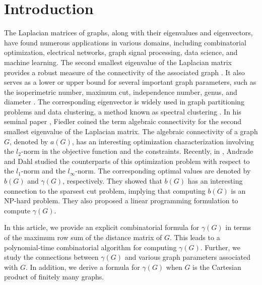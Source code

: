 \documentclass[12pt]{article}
\begin{document}
	\section{Introduction}
	The Laplacian matrices of graphs, along with their eigenvalues and eigenvectors, have found numerous applications in various domains, including combinatorial optimization, electrical networks, graph signal processing, data science, and machine learning. The second smallest eigenvalue of the Laplacian matrix provides a robust measure of the connectivity of the associated graph \cite{alg-con}.  It also serves as a lower or upper bound for several important graph parameters, such as the isoperimetric number, maximum cut, independence number, genus, and diameter \cite{mohar-lap-sur-1, mohar-eigen-comb-opti, trevisan_spec-partition}. The corresponding eigenvector is widely used in graph partitioning problems and data clustering, a method known as spectral clustering \cite{trevisan_spec-partition, ulrike-spectral}. In his seminal paper \cite{alg-con}, Fiedler coined the term algebraic connectivity for the second smallest eigenvalue of the Laplacian matrix. The algebraic connectivity of a graph $G$, denoted by $a(G)$,  has an interesting optimization characterization involving the $l_2$-norm in the objective function and the constraints. Recently, in \cite{enide-geir-2024}, Andrade and Dahl studied the counterparts of this optimization problem with respect to the $l_1$-norm and the $l_\infty$-norm. The corresponding optimal values are denoted by $b(G)$ and $\gamma (G)$, respectively. They showed that $b(G)$ has an interesting connection to the sparsest cut problem, implying that computing $b(G)$ is an NP-hard problem. They also proposed a linear programming formulation to compute $\gamma (G)$. 
	
	In this article, we provide an explicit combinatorial formula for $\gamma (G)$ in terms of the maximum row sum of the distance matrix of $G$. This leads to a polynomial-time combinatorial algorithm for computing $\gamma (G)$. Further, we study the connections between  $\gamma (G)$ and various graph parameters associated with $G$. In addition, we derive a formula for $\gamma(G)$ when $G$ is the Cartesian product of finitely many graphs.
	
\end{document}
